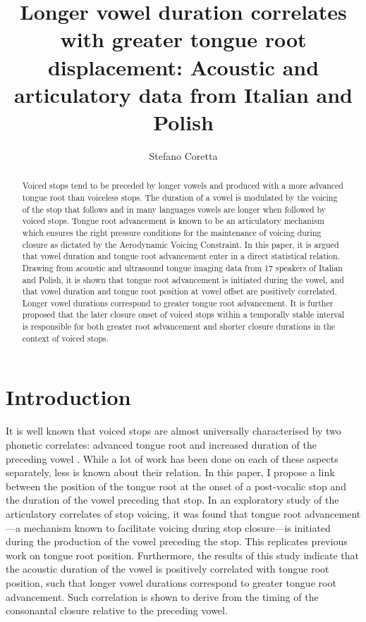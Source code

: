 \documentclass[12pt,]{article}
\title{Longer vowel duration correlates with greater tongue root displacement:
Acoustic and articulatory data from Italian and Polish}
\author{Stefano Coretta}
\date{}
\begin{document}
\maketitle

\begin{abstract}
Voiced stops tend to be preceded by longer vowels and produced with a more advanced tongue root than voiceless stops.
The duration of a vowel is modulated by the voicing of the stop that follows and in many languages vowels are longer when followed by voiced stops.
Tongue root advancement is known to be an articulatory mechanism which ensures the right pressure conditions for the maintenance of voicing during closure as dictated by the Aerodynamic Voicing Constraint.
In this paper, it is argued that vowel duration and tongue root advancement enter in a direct statistical relation.
Drawing from acoustic and ultrasound tongue imaging data from 17 speakers of Italian and Polish, it is shown that tongue root advancement is initiated during the vowel, and that vowel duration and tongue root position at vowel offset are positively correlated.
Longer vowel durations correspond to greater tongue root advancement.
It is further proposed that the later closure onset of voiced stops within a temporally stable interval is responsible for both greater root advancement and shorter closure durations in the context of voiced stops.
\end{abstract}

\hypertarget{introduction}{%
\section{Introduction}\label{introduction}}

It is well known that voiced stops are almost universally characterised
by two phonetic correlates: advanced tongue root and increased duration
of the preceding vowel \citep{westbury1983, lisker1974, fowler1992}.
While a lot of work has been done on each of these aspects separately,
less is known about their relation. In this paper, I propose a link
between the position of the tongue root at the onset of a post-vocalic
stop and the duration of the vowel preceding that stop. In an
exploratory study of the articulatory correlates of stop voicing, it was
found that tongue root advancement---a mechanism known to facilitate
voicing during stop closure---is initiated during the production of the
vowel preceding the stop. This replicates previous work on tongue root
position. Furthermore, the results of this study indicate that the
acoustic duration of the vowel is positively correlated with tongue root
position, such that longer vowel durations correspond to greater tongue
root advancement. Such correlation is shown to derive from the timing of
the consonantal closure relative to the preceding vowel.
\end{document}
